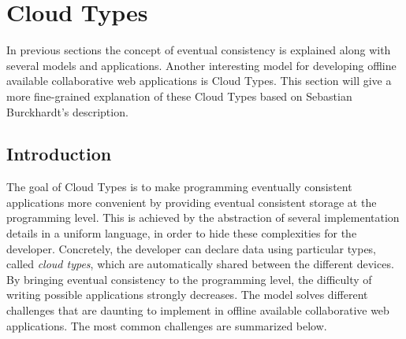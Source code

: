 \documentclass[a4paper,12pt]{report}
\begin{document}
\begin{comment}
In order to take account of these requirements, Cloud Types seems to best solution to implement offline available collaborative web applications. Cloud types focuses on most of the above criteria. Although, it has some shortcomings for easily implementing the desired applications. The Cloud Types model will be discussed in detail in the following section.

\end{comment}


\chapter{Cloud Types}\label{cha:CloudTypes} %

In previous sections the concept of eventual consistency is explained along with several models and applications. Another interesting model for developing offline available collaborative web applications is Cloud Types. This section will give a more fine-grained explanation of these Cloud Types based on Sebastian Burckhardt's description.

\section{Introduction}\label{sec:Introduction}

The goal of Cloud Types is to make programming eventually consistent applications more convenient by providing eventual consistent storage at the programming level. This is achieved by the abstraction of several implementation details in a uniform language, in order to hide these complexities for the developer. Concretely, the developer can declare data using particular types, called \textit{cloud types}, which are automatically shared between the different devices. By bringing eventual consistency to the programming level, the difficulty of writing possible applications strongly decreases. The model solves different challenges that are daunting to implement in offline available collaborative web applications. The most common challenges are summarized below.
\end{document}
